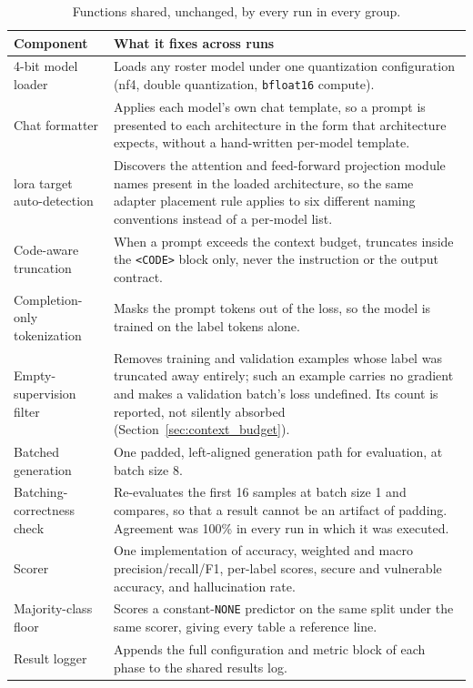 \begin{table}[H]
\centering
\caption{Functions shared, unchanged, by every run in every group.}
\label{tab:shared_funcs}
\footnotesize
\begin{tabular}{p{} p{}}
\toprule
\textbf{Component} & \textbf{What it fixes across runs} \\
\midrule
4-bit model loader &
Loads any roster model under one quantization configuration
(\gls{nf4}, double quantization, \texttt{bfloat16} compute). \\
Chat formatter &
Applies each model's own chat template, so a prompt is presented to each
architecture in the form that architecture expects, without a hand-written
per-model template. \\
\gls{lora} target auto-detection &
Discovers the attention and feed-forward projection module names present in the
loaded architecture, so the same adapter placement rule applies to six
different naming conventions instead of a per-model list. \\
Code-aware truncation &
When a prompt exceeds the context budget, truncates inside the
\texttt{<CODE>} block only, never the instruction or the output contract. \\
Completion-only tokenization &
Masks the prompt tokens out of the loss, so the model is trained on the label
tokens alone. \\
Empty-supervision filter &
Removes training and validation examples whose label was truncated away
entirely; such an example carries no gradient and makes a validation batch's
loss undefined. Its count is reported, not silently absorbed
(Section~\ref{sec:context_budget}). \\
Batched generation &
One padded, left-aligned generation path for evaluation, at batch size 8. \\
Batching-correctness check &
Re-evaluates the first 16 samples at batch size 1 and compares, so that a
result cannot be an artifact of padding. Agreement was 100\% in every run in
which it was executed. \\
Scorer &
One implementation of accuracy, weighted and macro precision/recall/F1,
per-label scores, secure and vulnerable accuracy, and hallucination rate. \\
Majority-class floor &
Scores a constant-\texttt{NONE} predictor on the same split under the same
scorer, giving every table a reference line. \\
Result logger &
Appends the full configuration and metric block of each phase to the shared
results log. \\
\bottomrule
\end{tabular}
\end{table}



